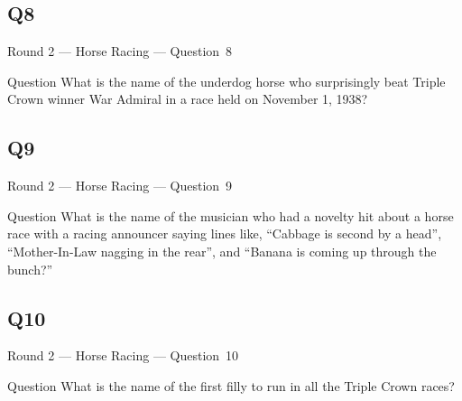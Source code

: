 \documentclass[11pt,draft]{beamer}
\begin{document}
\subsection*{Q8}
\begin{frame}[t]{Round 2 --- Horse Racing --- \mbox{Question 8}}
    \begin{block}{Question}
        What is the name of the underdog horse who surprisingly beat Triple Crown winner War Admiral in a race held on November 1, 1938?
    \end{block}
\end{frame}
\subsection*{Q9}
\begin{frame}[t]{Round 2 --- Horse Racing --- \mbox{Question 9}}
    \begin{block}{Question}
        What is the name of the musician who had a novelty hit about a horse race with a racing announcer saying lines like, ``Cabbage is second by a head'', ``Mother-In-Law nagging in the rear'', and ``Banana is coming up through the bunch?''
    \end{block}
\end{frame}
\subsection*{Q10}
\begin{frame}[t]{Round 2 --- Horse Racing --- \mbox{Question 10}}
    \begin{block}{Question}
        What is the name of the first filly to run in all the Triple Crown races?

    \end{block}
\end{frame}
\end{document}
